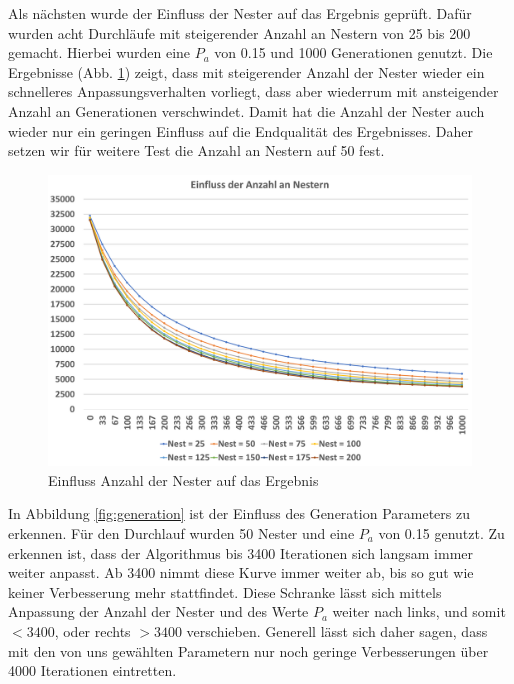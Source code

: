 \documentclass[conference]{IEEEtran}
\begin{document}
      Als nächsten wurde der Einfluss der Nester auf das Ergebnis geprüft. Dafür wurden acht Durchläufe mit steigerender Anzahl an Nestern von 25 bis 200 
      gemacht. Hierbei wurden eine $P_a$ von 0.15 und 1000 Generationen genutzt. Die Ergebnisse (Abb. \ref{fig:nests}) zeigt, dass mit steigerender Anzahl der Nester wieder
      ein schnelleres Anpassungsverhalten vorliegt, dass aber wiederrum mit ansteigender Anzahl an Generationen verschwindet. Damit hat die Anzahl der Nester auch wieder
      nur ein geringen Einfluss auf die Endqualität des Ergebnisses. Daher setzen wir für weitere Test die Anzahl an Nestern auf 50 fest. 

      \begin{figure}[H]
        \centering
        \includegraphics[width=0.8\linewidth]{Nester.png}
        \caption{Einfluss Anzahl der Nester auf das Ergebnis}
        \label{fig:nests}
      \end{figure}

      In Abbildung \ref{fig:generation} ist der Einfluss des Generation Parameters zu erkennen. Für den Durchlauf wurden 50 Nester und eine $P_a$ von 0.15 genutzt. 
      Zu erkennen ist, dass der Algorithmus bis 3400 Iterationen sich langsam immer weiter anpasst. Ab 3400 nimmt diese Kurve immer weiter ab, bis so gut wie keiner Verbesserung
      mehr stattfindet. Diese Schranke lässt sich mittels Anpassung der Anzahl der Nester und des Werte $P_a$ weiter nach links, und somit $<3400$, oder rechts $>3400$ verschieben.
      Generell lässt sich daher sagen, dass mit den von uns gewählten Parametern nur noch geringe Verbesserungen über 4000 Iterationen eintretten.
\end{document}
